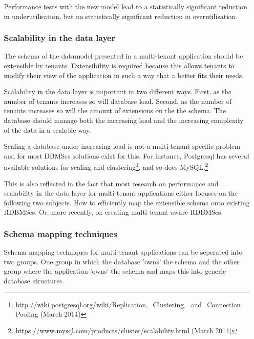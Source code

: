 Performance tests with the new model lead to a statistically significant reduction in underutilisation, but no statistically significant reduction in overutilisation.


\subsubsection{Scalability in the data layer}
The schema of the datamodel presented in a multi-tenant application should be extensible by tenants.
Extensibility is required because this allows tenants to modify their view of the application in such a way that a better fits their needs.

Scalability in the data layer is important in two different ways.
First, as the number of tenants increases so will database load.
Second, as the number of tenants increases so will the amount of extensions on the the schema. 
The database should manage both the increasing load and the increasing complexity of the data in a scalable way.

Scaling a database under increasing load is not a multi-tenant specific problem and for most DBMSes solutions exist for this. 
For instance, Postgresql has several available solutions for scaling and clustering\footnote{http://wiki.postgresql.org/wiki/Replication,\_Clustering,\_and\_Connection\_Pooling (March 2014)}, and so does MySQL.\footnote{https://www.mysql.com/products/cluster/scalability.html (March 2014)}

This is also reflected in the fact that most research on performance and scalability in the data layer for multi-tenant applications either focuses on the following two subjects.
How to efficiently map the extensible schema onto existing RDBMSes.\cite{aulbach2008multi, aulbach2009comparison} 
Or, more recently, on creating multi-tenant aware RDBMSes.\cite{schiller2011native, aulbach2011extensibility} 

\subsubsection{Schema mapping techniques}
Schema mapping techniques for multi-tenant applications can be seperated into two groups. 
One group in which the database 'owns' the schema  and the other group where the application 'owns' the schema and maps this into generic database structures.\cite{aulbach2009comparison}

